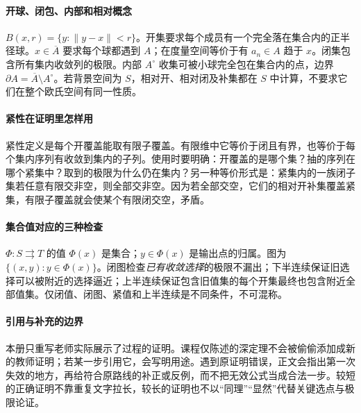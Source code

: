 \paragraph{开球、闭包、内部和相对概念}
$B(x,r)=\{y:\|y-x\|<r\}$。开集要求每个成员有一个完全落在集合内的正半径球。$x\in\overline A$ 要求每个球都遇到 $A$；在度量空间等价于有 $a_n\in A$ 趋于 $x$。闭集包含所有集内收敛列的极限。内部 $A^\circ$ 收集可被小球完全包在集合内的点，边界 $\partial A=\overline A\setminus A^\circ$。若背景空间为 $S$，相对开、相对闭及补集都在 $S$ 中计算，不要求它们在整个欧氏空间有同一性质。

\paragraph{紧性在证明里怎样用}
紧性定义是每个开覆盖能取有限子覆盖。有限维中它等价于闭且有界，也等价于每个集内序列有收敛到集内的子列。使用时要明确：开覆盖的是哪个集？抽的序列在哪个紧集中？取到的极限为什么仍在集内？另一种等价形式是：紧集内的一族闭子集若任意有限交非空，则全部交非空。因为若全部交空，它们的相对开补集覆盖紧集，有限子覆盖就会使某个有限闭交空，矛盾。

\paragraph{集合值对应的三种检查}
$\Phi:S\rightrightarrows T$ 的值 $\Phi(x)$ 是集合；$y\in\Phi(x)$ 是输出点的归属。图为 $\{(x,y):y\in\Phi(x)\}$。闭图检查\emph{已有收敛选择}的极限不漏出；下半连续保证旧选择可以被附近的选择逼近；上半连续保证包含旧值集的每个开集最终也包含附近全部值集。仅闭值、闭图、紧值和上半连续是不同条件，不可混称。

\paragraph{引用与补充的边界}
本册只重写老师实际展示了过程的证明。课程仅陈述的深定理不会被偷偷添加成新的教师证明；若某一步引用它，会写明用途。遇到原证明错误，正文会指出第一次失效的地方，再给符合原路线的补正或反例，而不把无效公式当成合法一步。较短的正确证明不靠重复文字拉长，较长的证明也不以“同理”“显然”代替关键选点与极限论证。
